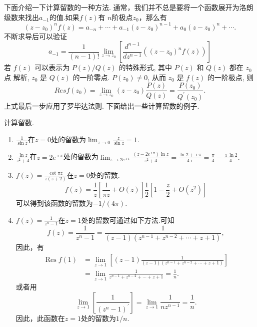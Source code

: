 下面介绍一下计算留数的一种方法.
通常，我们并不总是要将一个函数展开为洛朗级数来找出$a_{-1}$的值.如果$f(z)$有
$n$阶极点$z_0$，那么有
\begin{equation}
    \left(z-z_0\right)^n f(z)=a_{-n}+\cdots+a_{-1}\left(z-z_0\right)^{n-1}+a_0\left(z-z_0\right)^n+\cdots .
\end{equation}
不断求导后可以验证
\begin{equation}
    a_{-1}=\frac{1}{(n-1) !} \lim _{z \to z_0}\left[\frac{d^{n-1}}{d z^{n-1}}\left(\left(z-z_0\right)^n f(z)\right)\right]
\end{equation}
若 $f(z)$ 可以表示为 $P(z) / Q(z)$ 的特殊形式, 其中 $P(z)$ 和 $Q(z)$ 都在 $z_0$ 点 解析, $z_0$ 是 $Q(z)$ 的一阶零点. $P\left(z_0\right) \neq 0$, 从而 $z_0$ 是 $f(z)$ 的一阶极点, 则
\begin{equation}
    Res f\left(z_0\right)=\lim _{z \to z_0}\left(z-z_0\right) \frac{P(z)}{Q(z)}=\frac{P\left(z_0\right)}{Q^{\prime}\left(z_0\right)} .
\end{equation}
上式最后一步应用了罗毕达法则.
下面给出一些计算留数的例子.
\begin{examplebox}{计算留数.}
    
    \begin{enumerate}
        \item $\frac{1}{\sin z}$在$z=0$处的留数为$\lim_{z\to 0} \frac{z}{\sin{z}} = 1$.
        \item $\frac{\ln{z}}{z^2 + 4}$在$z=2e^{\imath \pi}$处的留数为$\lim_{z\to 2e^{\imath \pi}} \frac{(z-2e^{\imath \pi})\ln{z} }{z^2 + 4} = 
        \frac{\ln 2 + \imath \pi}{4\imath} = \frac{\pi}{4} - \frac{\imath\ln{2}}{4}.$
        \item $f(z) = \frac{\cot{\pi z}}{z(z+2)}$在$z=0$处的留数.\\
            \[
              f(z) = \frac{1}{z} \left[\frac{1}{\pi z} + O(z) \right]\frac{1}{2} \left[1 - \frac{z}{2} + O(z^2)\right]  
            \]
            可以得到该函数的留数为$-1/(4\pi)$.
        \item $f(z) = \frac{1}{z^n - 1}$在$z=1$处的留数可通过如下方法.可知
        \[
            f(z)=\frac{1}{z^n-1}=\frac{1}{(z-1)\left(z^{n-1}+z^{n-2}+\cdots+z+1\right)},
        \]
        因此，有
        \[
            \begin{aligned}
                \operatorname{Res} f(1) & =\lim _{z \to 1}\left[(z-1) \frac{1}{(z-1)\left(z^{n-1}+z^{n-2}+\cdots+z+1\right)}\right] \\
                & =\lim _{z \to 1} \frac{1}{z^{n-1}+z^{n-2}+\cdots+z+1}=\frac{1}{n} .
            \end{aligned}
        \]
        或者用 $$
        \lim _{z \to 1}\left[\frac{1}{\left(z^n-1\right)^{\prime}}\right]=\lim _{z \to 1} \frac{1}{n z^{n-1}}=\frac{1}{n} .
        $$ 因此，此函数在$z=1$处的留数为$1/n$.
    \end{enumerate}
\end{examplebox}


